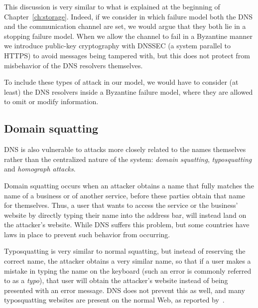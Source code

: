 \documentclass[mscthesis]{usiinfthesis}
\begin{document}
This discussion is very similar to what is explained at the beginning of Chapter~\ref{ch:storage}. Indeed, if we consider in which failure model both the DNS and the communication channel are set, we would argue that they both lie in a stopping failure model. When we allow the channel to fail in a Byzantine manner we introduce public-key cryptography with DNSSEC (a system parallel to HTTPS) to avoid messages being tampered with, but this does not protect from misbehavior of the DNS resolvers themselves.

To include these types of attack in our model, we would have to consider (at least) the DNS resolvers inside a Byzantine failure model, where they are allowed to omit or modify information.

\subsection{Domain squatting}\label{sec:squatting}

DNS is also vulnerable to attacks more closely related to the names themselves rather than the centralized nature of the system: \emph{domain squatting}, \emph{typosquatting} and \emph{homograph attacks}.

Domain squatting occurs when an attacker obtains a name that fully matches the name of a business or of another service, before these parties obtain that name for themselves. Thus, a user that wants to access the service or the business' website by directly typing their name into the address bar, will instead land on the attacker's website. While DNS suffers this problem, but some countries have laws in place to prevent such behavior from occurring.

Typosquatting is very similar to normal squatting, but instead of reserving the correct name, the attacker obtains a very similar name, so that if a user makes a mistake in typing the name on the keyboard (such an error is commonly referred to as a \emph{typo}), that user will obtain the attacker's website instead of being presented with an error message. DNS does not prevent this as well, and many typosquatting websites are present on the normal Web, as reported by~\cite{website:typosquatting}.
\end{document}
